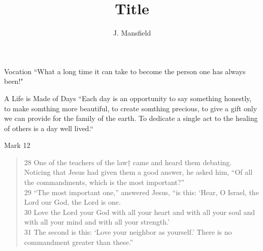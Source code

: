 \documentclass{beamer}
\title{Title}
\author{J. Mansfield}
\institute{Regis~University}
\begin{document}
\begin{frame}
\titlepage
\end{frame}

\begin{frame}
\begin{block}{Vocation}
 ``What a long time it can take to become the person one has always been!"~\cite{palmer}
\end{block}

\end{frame}

\begin{frame}
\begin{block}{A Life is Made of Days}
``Each day is an opportunity to say something honestly, to make somthing more beautiful, to create somthing precious, to give a gift only we can provide for the family of the earth. To dedicate a single act to the healing of others is a day well lived.``~\cite{muller}
\end{block}
\end{frame}


\begin{frame}
\begin{block}{Mark 12}
\begin{verse}
28 One of the teachers of the law† came and heard them debating. Noticing that Jesus had given them a good answer, he asked him, “Of all the commandments, which is the most important?” \\
29 “The most important one,” answered Jesus, “is this: ‘Hear, O Israel, the Lord our God, the Lord is one.\\
30 Love the Lord your God with all your heart and with all your soul and with all your mind and with all your strength.’\\
31 The second is this: ‘Love your neighbor as yourself.’ There is no commandment greater than these.” \\
\end{verse}
\cite[Kindle Locations 95560-95569]{niv}
\end{block}
\end{frame}

\begin{frame}
    \nocite{*}
    
    
\end{frame}
\end{document}
